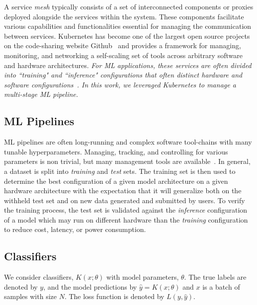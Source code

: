 \documentclass[conference]{IEEEtran}
\newcommand{\cm}[1]{\textit{{\color{blue}#1}}}
\begin{document}
A service \textit{mesh} typically consists of a set of interconnected components or proxies deployed alongside the services within the system. These components facilitate various capabilities and functionalities essential for managing the communication between services. Kubernetes has become one of the largest open source projects on the code-sharing website Github~\cite{k8s-size} and provides a framework for managing, monitoring, and networking a self-scaling set of tools across arbitrary software and hardware architectures. \cm{For ML applications, these services are often divided into ``training" and ``inference" configurations that often distinct hardware and software configurations~\cite{wang2019benchmarking}. In this work, we leveraged Kubernetes to manage a multi-stage ML pipeline.}

\subsection{ML Pipelines}
ML pipelines are often long-running and complex software tool-chains with many tunable hyperparameters. Managing, tracking, and controlling for various parameters is non trivial, but many management tools are available~\cite{dvc,hydra,k8s}. In general, a dataset is split into \textit{training} and \textit{test} sets. The training set is then used to determine the best configuration of a given model architecture on a given hardware architecture with the expectation that it will generalize both on the withheld test set and on new data generated and submitted by users. To verify the training process, the test set is validated against the \textit{inference} configuration of a model which may run on different hardware than the \textit{training} configuration to reduce cost, latency, or power consumption. 

\subsection{Classifiers}

We consider classifiers, $K(x; \theta)$ with model parameters, $\theta$. The true labels are denoted by $y$, and the model predictions by $\hat{y} = K(x; \theta)$ and $x$ is a batch of samples with size $N$. The loss function is denoted by $L(y, \hat{y})$.
\end{document}
